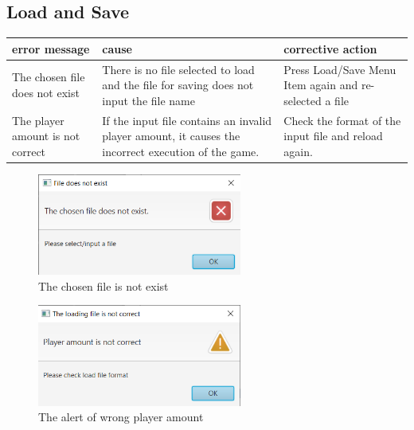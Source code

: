 
\subsection{Load and Save}


\begin{table}[h]
	\centering
	\begin{tabular}{p{2.5cm}@{\hskip 5mm}  p{5cm}@{\hskip 5mm} p{6.5cm}} 
		\toprule
		error message   & cause      & corrective action  \\ 
		\midrule
		\midrule
     	The chosen file does not exist & There is no file selected to load and the file for saving does not input the file name & Press Load/Save Menu Item again and re-selected a file  \\
	    \midrule
	    The player amount is not correct & If the input file contains an invalid player amount, it causes the incorrect execution of the game. & Check the format of the input file and reload again. \\

		\bottomrule
	\end{tabular}
\end{table}

\begin{figure}[h]
	\centering
	\includegraphics[width=0.6\textwidth]{image/SaveAndLoad}
	\caption{The chosen file is not exist}
	\label{fig:The chosen file does not exist}
\end{figure}

\begin{figure}[h]
	\centering
	\includegraphics[width=0.6\textwidth]{image/alertPlayerAmount}
	\caption{The alert of wrong player amount}
	\label{fig:The alert of wrong player amount}
\end{figure}